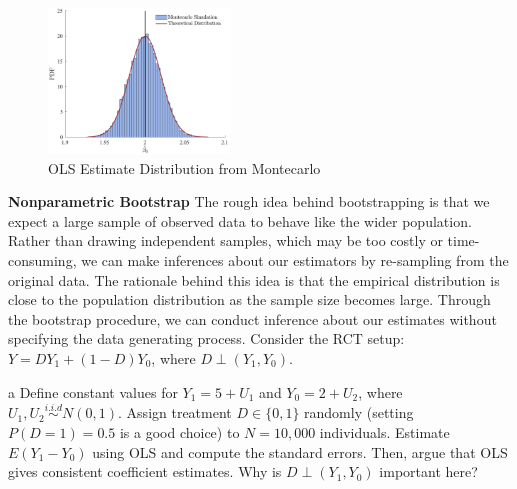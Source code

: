 \documentclass{article}
\begin{document}
\begin{solution}
\begin{equation*}
\end{equation*}
\begin{figure}[htb]
    \centering
    \caption{OLS Estimate Distribution from Montecarlo}
    \label{ea3:ps1:q3a:fig1}
    \includegraphics[width=0.43\textwidth]{Figures/p3qa.pdf}
\end{figure}

\end{solution}
\FloatBarrier
\underline{\hspace{\textwidth}}
\textbf{Nonparametric Bootstrap}
The rough idea behind bootstrapping is that we expect a large sample of observed data to behave like the wider population. Rather than drawing independent samples, which may be too costly or time-consuming, we can make inferences about our estimators by re-sampling from the original data. The rationale behind this idea is that the empirical distribution is close to the population distribution as the sample size becomes large. Through the bootstrap procedure, we can conduct inference about our estimates without specifying the data generating process. Consider the RCT setup: $Y=D Y_{1}+(1-D) Y_{0}$, where $D \perp\left(Y_{1}, Y_{0}\right)$.
\begin{problem}{a}
Define constant values for $Y_{1}=5+U_{1}$ and $Y_{0}=2+U_{2}$, where $U_{1}, U_{2} \stackrel{i . i . d}{\sim} N(0,1)$. Assign treatment $D \in\{0,1\}$ randomly (setting $P(D=1)=0.5$ is a good choice) to $N=10,000$ individuals. Estimate $E\left(Y_{1}-Y_{0}\right)$ using OLS and compute the standard errors. Then, argue that OLS gives consistent coefficient estimates. Why is $D \perp\left(Y_{1}, Y_{0}\right)$ important here?
\end{problem}
\end{document}
